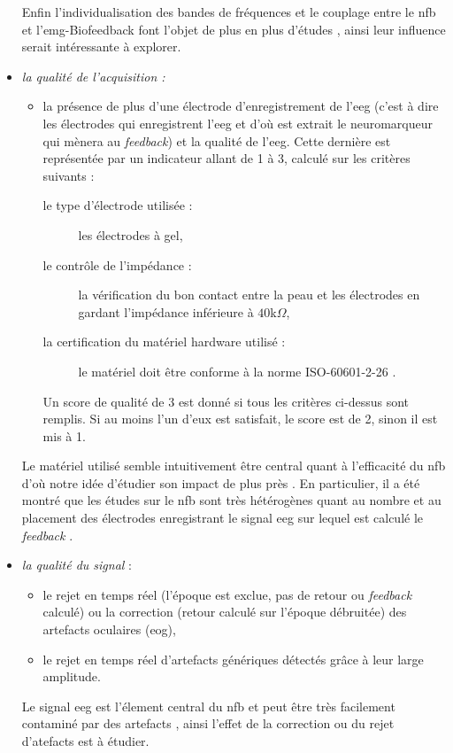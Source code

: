 \begin{itemize}
Enfin l'individualisation des bandes de fréquences et le couplage entre le \gls{nfb} et l'\gls{emg}-Biofeedback font l'objet de plus en plus d'études \citep{Bioulac2019, Bazanova2018, Bink2014,
Duric2012, Enriquez2017, Klimesch1999}, ainsi leur influence serait intéressante à explorer. 
\item \emph{la qualité de l'acquisition :} 
    \begin{itemize}
    \item la présence de plus d'une électrode d'enregistrement de l'\gls{eeg} (c'est à dire les électrodes qui enregistrent l'\gls{eeg} et d'où 
		est extrait le neuromarqueur qui mènera au \textit{feedback}) et la qualité de 
		l'\gls{eeg}. Cette dernière est représentée par un indicateur allant de 1 à 3, calculé sur les critères suivants : 
        \begin{description} 
        \item[le type d'électrode utilisée :] les électrodes à gel,
        \item[le contrôle de l'impédance :] la vérification du bon contact entre la peau et les électrodes en gardant l'impédance inférieure à $40$k$\Omega$,
        \item[la certification du matériel hardware utilisé :] le matériel doit être conforme à la norme ISO-60601-2-26 \citep{ISO}.
        \end{description}
    Un score de qualité de 3 est donné si tous les critères ci-dessus sont remplis. Si au moins l'un d'eux est satisfait, le score est de 2, sinon il est mis à 1.
		\end{itemize}
Le matériel utilisé semble intuitivement être central quant à l'efficacité du \gls{nfb} d'où notre idée d'étudier son impact de plus près \citep{Lopez2014}. En particulier,
il a été montré que les études sur le \gls{nfb} sont très hétérogènes quant au nombre et au placement des électrodes enregistrant le signal \gls{eeg} sur 
lequel est calculé le \textit{feedback} \citep{Enriquez2017, Rogala2016}.
\item \emph{la qualité du signal} : 
    \begin{itemize}
    \item le rejet en temps réel (l'époque est exclue, pas de retour ou \emph{feedback} calculé) ou la correction (retour calculé sur l'époque débruitée) des 
artefacts oculaires (\gls{eog}),
    \item le rejet en temps réel d'artefacts génériques détectés grâce à leur large amplitude. 
    \end{itemize}
Le signal \gls{eeg} est l'élement central du \gls{nfb} et peut être très facilement contaminé par des artefacts \citep{Chavez2018}, ainsi l'effet de la correction ou du rejet 
d'atefacts est à étudier. 
\end{itemize}

